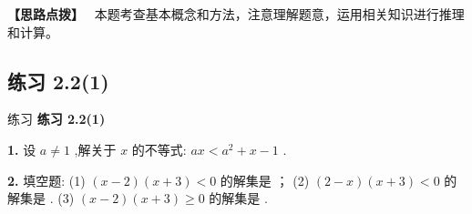 \documentclass[a4paper,10pt,oneside,fontset=none]{ctexbook}
\renewcommand{\geq}{\geqslant}
\newcommand{\fillin}[1][2cm]{\,\underline{\hspace{#1}}\,}
\newenvironment{exercise}[1][]{\begin{exBox}{练习}{#1}}{\end{exBox}}
\numberwithin{equation}{chapter}
\newenvironment{hint}{\begin{hintBox}\textbf{【思路点拨】}~}{\end{hintBox}}
\begin{document}
\begin{hint}
本题考查基本概念和方法，注意理解题意，运用相关知识进行推理和计算。
\end{hint}

\subsection*{练习 2.2(1)}

\begin{exercise}
\textbf{练习 2.2(1)}\par\vspace{0.5em}
\textbf{1.} 设 $a \neq  1$ ,解关于 $x$ 的不等式: ${ax} < {a}^{2} + x - 1$ .
\par\vspace{0.8em}
\textbf{2.} 填空题: (1) $\left( {x - 2}\right) \left( {x + 3}\right)  < 0$ 的解集是\fillin[2cm]； (2) $\left( {2 - x}\right) \left( {x + 3}\right)  < 0$ 的解集是\fillin[2cm]. (3) $\left( {x - 2}\right) \left( {x + 3}\right)  \geq  0$ 的解集是\fillin[2cm].
\par\vspace{0.8em}

\end{exercise}
\end{document}
